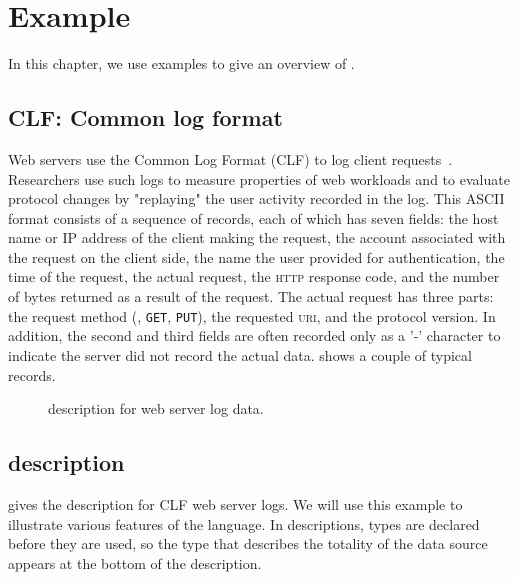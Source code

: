 \chapter{Example}
\label{chap:example}
In this chapter, we use examples to give an overview of \pads{}.

\section{CLF: Common log format}
\label{sec:example:common-log-format}
Web servers use the Common Log Format (CLF) to log client
requests~\cite{wpp}.  Researchers use such logs to measure
properties of web workloads and to evaluate protocol changes
by "replaying" the user activity recorded in the log.
This ASCII format consists of a sequence of
records, each of which has seven fields: the host name or IP address
of the client making the request, the account associated with the
request on the client side, the name the user provided for
authentication, the time of the request, the actual request, the
\textsc{http} response code, and the number of bytes returned as a
result of the request.  The actual request has three parts: the
request method (\eg, \texttt{GET}, \texttt{PUT}), the requested
\textsc{uri}, and the protocol version.  In addition, the second and
third fields are often recorded only as a '-' character to indicate
the server did not record the actual data.  
shows a couple of typical records.

\begin{figure*}[t!]
\end{figure*}

\begin{figure}

\caption{\pads{} description for web server log data.}
\label{figure:wsl}
\end{figure}


\section{\padsl{} description}
\label{sec:example:padsl-description}
 gives the \pads{} description for CLF web server logs.  
We will use this example to illustrate various features of the \pads{}
language.  In \pads{} descriptions, types are declared before they are
used, so the type that describes the totality of the data source
appears at the bottom of the description. 

